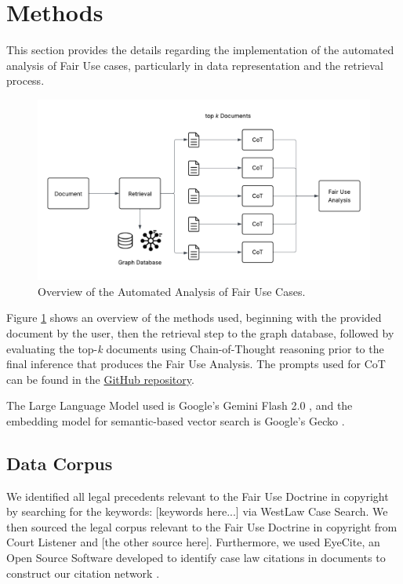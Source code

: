 \section{Methods}
\label{sec: Methods}

This section provides the details regarding the implementation of the automated analysis of Fair Use cases, particularly in data representation and the retrieval process.

\begin{figure}[h]
    \centering
    \includegraphics[width=\linewidth]{FairUseAnalysis.png}
    \caption{Overview of the Automated Analysis of Fair Use Cases.}
    \label{fig:fair_use_legal_bot}
\end{figure}

Figure \ref{fig:fair_use_legal_bot} shows an overview
of the methods used, beginning with the provided document by the user, then the retrieval step to the graph database, followed by evaluating the top-\textit{k} documents using Chain-of-Thought reasoning prior to the final inference that produces the Fair Use Analysis. The prompts used for CoT can be found in the \href{https://github.com/justinhjy1004/FairUseLegalBot/blob/main/RetrievelTesting/evaluator.py}{GitHub repository}.

The Large Language Model used is Google's Gemini Flash 2.0 \cite{11_GeminiLLM}, and the embedding model for semantic-based vector search is Google's Gecko \cite{29_GeckoEmbeddings}.

\subsection{Data Corpus}

We identified all legal precedents relevant to the Fair Use Doctrine in copyright by searching for the keywords: [keywords here...] via WestLaw Case Search. We then sourced the legal corpus relevant to the Fair Use Doctrine in copyright from Court Listener \cite{25_free_law_project_recap_2020} and [the other source here]. Furthermore, we used EyeCite, an Open Source Software developed to identify case law citations in documents to construct our citation network \cite{24_eyecite}. 

